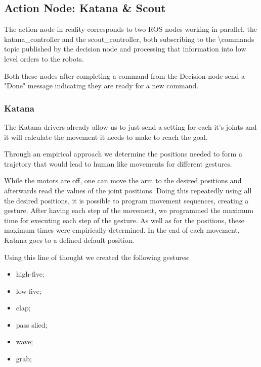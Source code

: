 \subsection{Action Node: Katana \& Scout}

The action node in reality corresponds to two ROS nodes working in parallel, the katana\_controller and the scout\_controller, both subscribing to the \textbackslash commands topic published by the decision node and processing that information into low level orders to the robots.

Both these nodes after completing a command from the Decision node send a "Done" message indicating they are ready for a new command.

\subsubsection{Katana}


The Katana drivers already allow us to just send a setting for each it's joints and it will calculate the movement it needs to make to reach the goal. 

Through an empirical approach we determine the positions needed to form a trajetory that would lead to human like movements for different gestures.

While the motors are off, one can move the arm to the desired positions and afterwards read the values of the joint positions. Doing this repeatedly using all the desired positions, it is possible to program movement sequences, creating a gesture. After having each step of the movement, we programmed the maximum time for executing each step of the gesture. As well as for the positions, these maximum times were empirically determined. In the end of each movement, Katana goes to a defined default position.

Using this line of thought we created the following gestures: 

\begin{itemize}
\item high-five;
\item low-five; 
\item clap;
\item pass slied;
\item wave;
\item grab;
\end{itemize}

